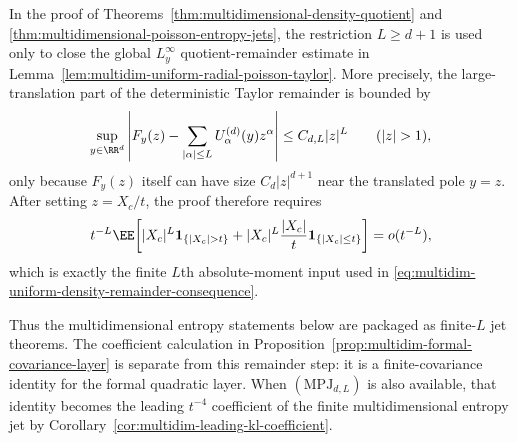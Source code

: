 \begin{lemma}%
\label{lem:multidim-threshold-proof-interface}
In the proof of
Theorems~\ref{thm:multidimensional-density-quotient} and
\ref{thm:multidimensional-poisson-entropy-jets}, the restriction
\(L\ge d+1\) is used only to close the global
\(L^\infty_y\) quotient-remainder estimate in
Lemma~\ref{lem:multidim-uniform-radial-poisson-taylor}.  More precisely, the
large-translation part of the deterministic Taylor remainder is bounded by
\[
\sup_{y\in\RR^d}
\left|
F_y(z)-\sum_{|\alpha|\le L}U_\alpha^{(d)}(y)z^\alpha
\right|
\le C_{d,L}|z|^L
\qquad(|z|>1),
\]
only because \(F_y(z)\) itself can have size \(C_d|z|^{d+1}\) near the
translated pole \(y=z\).  After setting \(z=X_c/t\), the proof therefore
requires
\[
t^{-L}\EE\!\left[
|X_c|^L\mathbf1_{\{|X_c|>t\}}
+|X_c|^L\frac{|X_c|}{t}\mathbf1_{\{|X_c|\le t\}}
\right]=o(t^{-L}),
\]
which is exactly the finite \(L\)th absolute-moment input used in
\eqref{eq:multidim-uniform-density-remainder-consequence}.

Thus the multidimensional entropy statements below are packaged as
finite-\(L\) jet theorems.  The coefficient calculation in
Proposition~\ref{prop:multidim-formal-covariance-layer} is separate from this
remainder step: it is a finite-covariance identity for the formal quadratic
layer.
When \((\mathrm{MPJ}_{d,L})\) is also available, that identity becomes the
leading \(t^{-4}\) coefficient of the finite multidimensional entropy jet by
Corollary~\ref{cor:multidim-leading-kl-coefficient}.
\end{lemma}

